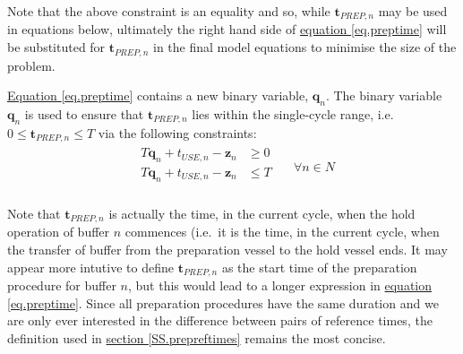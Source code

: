 Note that the above constraint is an equality and so, while
$\boldsymbol{t}_{\mathit{PREP},n}$ may be used in equations below, ultimately
the right hand side of \hyperref[eq.preptime]{equation \ref*{eq.preptime}}
will be substituted for $\boldsymbol{t}_{\mathit{PREP},n}$ in the final model
equations to minimise the size of the problem.

\hyperref[eq.preptime]{Equation \ref*{eq.preptime}} contains a new binary 
variable, $\boldsymbol{q}_{n}$.
The binary variable $\boldsymbol{q}_{n}$ is used to ensure that
$\boldsymbol{t}_{\mathit{PREP},n}$ lies within the single-cycle range, i.e.\
$0 \le \boldsymbol{t}_{\mathit{PREP},n} \le T$ via the following constraints:
\begin{equation}
    \begin{split}
        \begin{alignedat}{2}
            T \boldsymbol{q}_{n} + t_{\mathit{USE},n} - \boldsymbol{z}_{n} &\ge
            0\\
            T \boldsymbol{q}_{n} + t_{\mathit{USE},n} - \boldsymbol{z}_{n} &\le
            T\\
        \end{alignedat}
    \end{split}
    \quad \forall n \in N
    \label{eq.constrxx}
\end{equation}

Note that $\boldsymbol{t}_{\mathit{PREP},n}$ is actually the time, in the
current cycle, when the hold operation of buffer $n$ commences (i.e.\ it is the
time, in the current cycle, when the transfer of buffer from the preparation
vessel to the hold vessel ends.  It may appear more intutive to define
$\boldsymbol{t}_{\mathit{PREP},n}$ as the start time of the preparation
procedure for buffer $n$, but this would lead to a longer expression in
\hyperref[eq.preptime]{equation \ref*{eq.preptime}}.
Since all preparation procedures have the same duration and we are only ever
interested in the difference between pairs of reference times, the definition
used in \hyperref[SS.prepreftimes]{section \ref*{SS.prepreftimes}} remains
the most concise.

